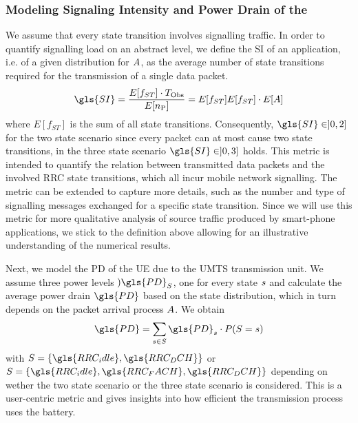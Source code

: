 \subsubsection*{Modeling Signaling Intensity and Power Drain of the }\label{sec:network:performance_model:analytical_model:metrics}

\newcommand{\fStateTransitions}{E[f_{ST}]}

We assume that every state transition involves signalling traffic.
In order to quantify signalling load on an abstract level, we define the \gls{SI} of an application, i.e. of a given distribution for \(A\), as the average number of state transitions required for the transmission of a single data packet.
\begin{equation}
\gls{SI} = \frac{\fStateTransitions \cdot \ObservationInterval}{E[\NObservedPackets]}\\
= \fStateTransitions {E[f_{ST}] }\cdot E[\PacketIAT]
\label{eq::sigIntensity}
\end{equation}
where \(\fStateTransitions\) is the sum of all state transitions.
Consequently, \(\gls{SI} \in ]0,2]\) for the two state scenario since every packet can at most cause two state transitions, in the three state scenario \(\gls{SI} \in]0,3]\) holds.
This metric is intended to quantify the relation between transmitted data packets and the involved \gls{RRC} state transitions, which all incur mobile network signalling.
The metric can be extended to capture more details, such as the number and type of signalling messages exchanged for a specific state transition.
Since we will use this metric for more qualitative analysis of source traffic produced by smart-phone applications, we stick to the definition above allowing for an illustrative understanding of the numerical results.

Next, we model the \gls{PD} of the \gls{UE} due to the \gls{UMTS} transmission unit. 
We assume three power levels \()\gls{PD}_{\RRCState}\), one for every state \(s\) and calculate the average power drain \(\gls{PD}\) based on the state distribution, which in turn depends on the packet arrival process \(A\).
We obtain
\begin{equation}
\gls{PD} = \sum_{\RRCStateRealization\in\RRCState} \gls{PD}_{\RRCStateRealization} \cdot P(\RRCState=\RRCStateRealization)
\label{eq::powerdrain}
\end{equation}
with \(\RRCState = \{\gls{RRC_idle},\gls{RRC_DCH}\}\) or \(\RRCState = \{\gls{RRC_idle},\gls{RRC_FACH},\gls{RRC_DCH}\}\) depending on wether the two state scenario or the three state scenario is considered.
This is a user-centric metric and gives insights into how efficient the transmission process uses the battery. 